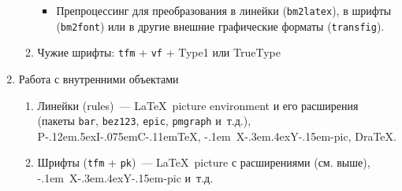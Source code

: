 \documentclass[a4paper,12pt]{article}
\def\PiCTeX{{\rm P\kern-.12em\lower.5ex\hbox{I}\kern-.075emC\kern-.11em\TeX}}
\def\Xy{\leavevmode\hbox{\kern-.1em X\kern-.3em\lower.4ex\hbox{Y\kern-.15em}}}
\begin{document}
\begin{enumerate}
\begin{enumerate}
\begin{itemize}
                \item Препроцессинг для преобразования в линейки
                (\texttt{bm2latex}), в шрифты (\texttt{bm2font}) или в
                другие внешние графические форматы
                (\texttt{transfig}).

                \end{itemize}

        \item \<Чужие\> шрифты: \texttt{tfm} + \texttt{vf} + Type1 или
        TrueType

        \end{enumerate}

\item Работа с внутренними объектами

        \begin{enumerate}

        \item Линейки (rules)~--- \<\LaTeX\ picture
        environment\> и его расширения (пакеты \texttt{bar},
        \texttt{bez123}, \texttt{epic}, \texttt{pmgraph} и~т.д.), \PiCTeX,
        \Xy-pic, Dra\TeX.

        \item Шрифты (\texttt{tfm} + \texttt{pk})~--- \LaTeX\ picture с
        расширениями (см. выше), \Xy-pic и~т.д.

        \end{enumerate}

\end{enumerate}
\end{document}
